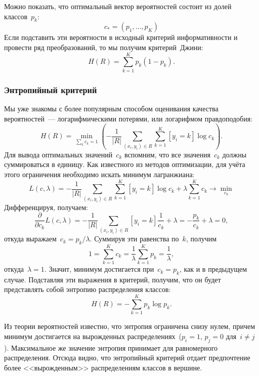 \documentclass[12pt,fleqn]{article}
\begin{document}
Можно показать, что оптимальный вектор вероятностей состоит из долей классов~$p_k$:
\[
    c_* = (p_1, \dots, p_K)
\]
Если подставить эти вероятности в исходный критерий информативности
и провести ряд преобразований, то мы получим критерий~Джини:
\[
    H(R)
    =
    \sum_{k = 1}^{K}
        p_k (1 - p_k).
\]

\subsubsection{Энтропийный критерий}
Мы уже знакомы с более популярным способом оценивания качества
вероятностей~--- логарифмическими потерями, или логарифмом правдоподобия:
\[
    H(R)
    =
    \min_{\sum_k c_k = 1} \left(
        -
        \frac{1}{|R|}
        \sum_{(x_i, y_i) \in R}
        \sum_{k = 1}^{K}
            [y_i = k]
            \log c_k
    \right).
\]
Для вывода оптимальных значений~$c_k$ вспомним, что все значения~$c_k$
должны суммироваться в единицу.
Как известного из методов оптимизации, для учёта этого ограничения необходимо искать
минимум лагранжиана:
\[
    L(c, \lambda)
    =
    -
    \frac{1}{|R|}
    \sum_{(x_i, y_i) \in R}
    \sum_{k = 1}^{K}
        [y_i = k]
        \log c_k
    +
    \lambda
    \sum_{k = 1}^{K}
        c_k
    \to
    \min_{c_k}
\]
Дифференцируя, получаем:
\[
    \frac{\partial}{\partial c_k}
    L(c, \lambda)
    =
    -
    \frac{1}{|R|}
    \sum_{(x_i, y_i) \in R}
        [y_i = k]
        \frac{1}{c_k}
    +
    \lambda
    =
    - \frac{p_k}{c_k}
    +
    \lambda
    =
    0,
\]
откуда выражаем~$c_k = p_k / \lambda$.
Суммируя эти равенства по~$k$, получим
\[
    1 = \sum_{k = 1}^{K} c_k = \frac{1}{\lambda} \sum_{k = 1}^{K} p_k = \frac{1}{\lambda},
\]
откуда~$\lambda = 1$.
Значит, минимум достигается при~$c_k = p_k$, как и в предыдущем случае.
Подставляя эти выражения в критерий, получим, что он будет представлять собой энтропию распределения классов:
\[
    H(R)
    =
    -
    \sum_{k = 1}^{K}
        p_k
        \log p_k.
\]

Из теории вероятностей известно, что энтропия ограничена снизу нулем, причем минимум достигается на вырожденных
распределениях~($p_i = 1$, $p_j = 0$ для~$i \neq j$).
Максимальное же значение энтропия принимает для равномерного распределения.
Отсюда видно, что энтропийный критерий отдает предпочтение более <<вырожденным>> распределениям классов
в вершине.

\end{document}
